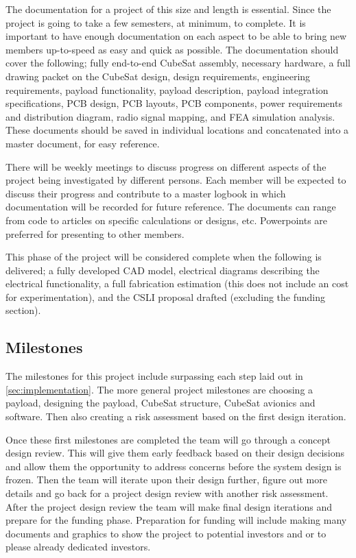 \documentclass[conference]{IEEEtran} %
\begin{document}
The documentation for a project of this size and length is essential. Since the project is going to take a few semesters, at minimum, to complete. It is important
to have enough documentation on each aspect to be able to bring new members up-to-speed as easy and quick as possible. The documentation should cover the following; fully end-to-end CubeSat assembly,
necessary hardware, a full drawing packet on the CubeSat design, design requirements, engineering requirements, payload functionality, payload description, payload integration specifications, PCB design,
PCB layouts, PCB components, power requirements and distribution diagram, radio signal mapping, and FEA simulation analysis. These documents should be saved in individual locations
and concatenated into a master document, for easy reference.

There will be weekly meetings to discuss progress on different aspects of the project being investigated by different persons. Each member will be expected to discuss
their progress and contribute to a master logbook in which documentation will be recorded for future reference. The documents can range from code to articles on specific calculations
or designs, etc. Powerpoints are preferred for presenting to other members.

This phase of the project will be considered complete when the following is delivered; a fully developed CAD model, electrical diagrams describing the electrical functionality,
 a full fabrication estimation (this does not include an cost for experimentation), and the CSLI proposal drafted (excluding the funding section).

\subsection{Milestones}
\label{subsec:milestones}
The milestones for this project include surpassing each step laid out in \autoref{sec:implementation}. The more general project milestones are choosing a payload,
designing the payload, CubeSat structure, CubeSat avionics and software. Then also creating a risk assessment based on the first design iteration.

Once these first milestones are completed the team will go through a concept design review. This will give them early feedback based on their design decisions and
allow them the opportunity to address concerns before the system design is frozen. Then the team will iterate upon their design further, figure out more details and
go back for a project design review with another risk assessment. After the project design review the team will make final design iterations and prepare for the funding phase.
Preparation for funding will include making many documents and graphics to show the project to potential investors and or to please already dedicated investors.
\end{document}
